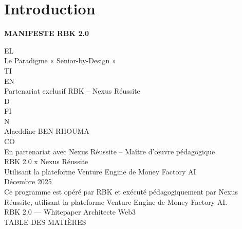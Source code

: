 \section*{Introduction}
\begin{center}\Large\textbf{MANIFESTE RBK 2.0}\end{center}
\vspace{0.5em}
\vspace{0.5em}
\vspace{0.5em}
\vspace{0.5em}
EL\\
Le Paradigme « Senior-by-Design »\\
\vspace{0.5em}
\vspace{0.5em}
\vspace{0.5em}
\vspace{0.5em}
TI\\
EN\\
Partenariat exclusif RBK – Nexus Réussite\\
\vspace{0.5em}
\vspace{0.5em}
\vspace{0.5em}
\vspace{0.5em}
D\\
FI\\
N\\
Alaeddine BEN RHOUMA\\
CO\\
En partenariat avec Nexus Réussite – Maître d’œuvre pédagogique\\
\vspace{0.5em}
\vspace{0.5em}
RBK 2.0 x Nexus Réussite\\
Utilisant la plateforme Venture Engine de Money Factory AI\\
\vspace{0.5em}
Décembre 2025\\
\vspace{0.5em}
Ce programme est opéré par RBK et exécuté pédagogiquement par Nexus Réussite, utilisant la plateforme Venture Engine de Money Factory AI.\\
RBK 2.0 — Whitepaper Architecte Web3\\
\vspace{0.5em}
\vspace{0.5em}
\vspace{0.5em}
TABLE DES MATIÈRES\\
\vspace{0.5em}
